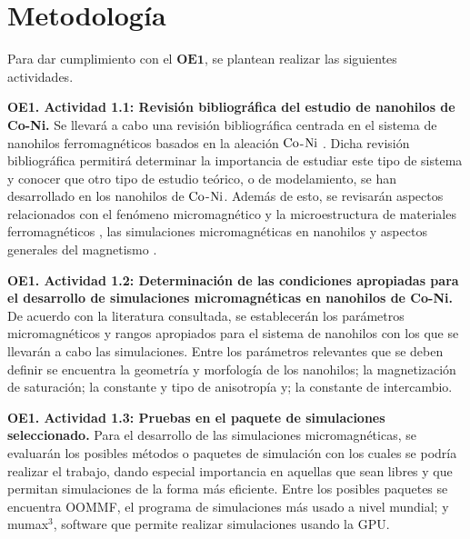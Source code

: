 \newpage
\section{Metodología}

Para dar cumplimiento con el $\textbf{OE1}$, se plantean realizar las siguientes actividades.

\vspace{10pt}

\textbf{OE1. Actividad 1.1: Revisión bibliográfica del estudio de nanohilos de Co-Ni.} Se llevará a cabo una revisión bibliográfica centrada en el sistema de nanohilos ferromagnéticos basados en la aleación $\ce{Co}$-$\ce{Ni}$ \cite{CylindricalMagneticNonowires,ExoticMagneticConfiguration,FieldTuneble}. Dicha revisión bibliográfica permitirá determinar la importancia de estudiar este tipo de sistema y conocer que otro tipo de estudio teórico, o de modelamiento, se han desarrollado en los nanohilos de $\ce{Co}$-$\ce{Ni}$. Además de esto, se revisarán aspectos relacionados con el fenómeno micromagnético y la microestructura de materiales ferromagnéticos \cite{Exl2020,KronmüllerMicromagnetism}, las simulaciones micromagnéticas en nanohilos \cite{Kumar_2017,miltat2007numerical} y aspectos generales del magnetismo \cite{jackson2012classical,coey_2010}.

\vspace{10pt}
    
\textbf{OE1. Actividad 1.2: Determinación de las condiciones apropiadas para el desarrollo de simulaciones micromagnéticas en nanohilos de Co-Ni.} De acuerdo con la literatura consultada, se establecerán los parámetros micromagnéticos y rangos apropiados para el sistema de nanohilos con los que se llevarán a cabo las simulaciones. Entre los parámetros relevantes que se deben definir se encuentra la geometría y morfología de los nanohilos; la magnetización de saturación; la constante y tipo de anisotropía y; la constante de intercambio.

\vspace{10pt}

\textbf{OE1. Actividad 1.3: Pruebas en el paquete de simulaciones seleccionado.} Para el desarrollo de las simulaciones micromagnéticas, se evaluarán los posibles métodos o paquetes de simulación con los cuales se podría realizar el trabajo, dando especial importancia en aquellas que sean libres y que permitan simulaciones de la forma más eficiente. Entre los posibles paquetes se encuentra OOMMF, el programa de simulaciones más usado a nivel mundial; y mumax$^3$, software que permite realizar simulaciones usando la GPU.

